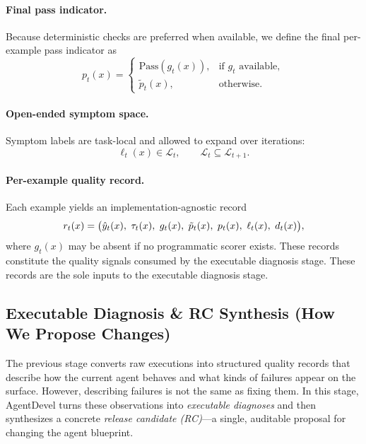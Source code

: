 \documentclass[11pt]{article}
\begin{document}
\paragraph{Final pass indicator.}
Because deterministic checks are preferred when available, we define the final per-example pass indicator as
\begin{equation}
p_t(x)=
\begin{cases}
\mathrm{Pass}\!\left(g_t(x)\right), & \text{if $g_t$ available},\\[4pt]
\tilde{p}_t(x), & \text{otherwise}.
\end{cases}
\end{equation}

\paragraph{Open-ended symptom space.}
Symptom labels are task-local and allowed to expand over iterations:
\begin{equation}
\ell_t(x)\in\mathcal{L}_t,\qquad \mathcal{L}_t \subseteq \mathcal{L}_{t+1}.
\end{equation}

\paragraph{Per-example quality record.}
Each example yields an implementation-agnostic record
\begin{equation}
\small
r_t(x)=\\\big(\hat{y}_t(x),\ \tau_t(x),\ g_t(x),\ \tilde{p}_t(x),\ p_t(x),\ \ell_t(x),\ d_t(x)\big),
\end{equation}
where $g_t(x)$ may be absent if no programmatic scorer exists. These records constitute the quality signals consumed by the executable diagnosis stage. These records are the sole inputs to the executable diagnosis stage.

\subsection{Executable Diagnosis \& RC Synthesis (How We Propose Changes)}
\label{sec:diagnosis}

The previous stage converts raw executions into structured quality records that describe how the current agent behaves and what kinds of failures appear on the surface. However, describing failures is not the same as fixing them. In this stage, AgentDevel turns these observations into \emph{executable diagnoses} and then synthesizes a concrete \emph{release candidate (RC)}—a single, auditable proposal for changing the agent blueprint.
\end{document}
